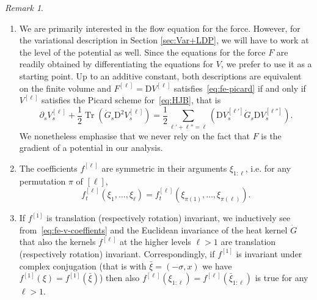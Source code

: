 \documentclass[11pt, a4paper]{scrartcl}
\numberwithin{equation}{section}
\theoremstyle{plain}
\theoremstyle{remark}
\newtheorem{remark}[foo]{Remark}
\newcommand{\mathD}{\mathrm{D}}
\newcommand{\tmdummy}{$\mbox{}$}
\newcommand{\tmop}[1]{\ensuremath{\operatorname{#1}}}
\newenvironment{enumeratealpha}{\begin{enumerate}[a{\textup{)}}] }{\end{enumerate}}
\begin{document}
\begin{remark}
  \label{rem:flow-eq}{\tmdummy}
  
  \begin{enumeratealpha}
    \item We are primarily interested in the flow equation for the force.
    However, for the variational description in Section \ref{sec:Var+LDP}, we
    will have to work at the level of the potential as well. Since the
    equations for the force $F$ are readily obtained by differentiating the
    equations for $V$, we prefer to use it as a starting point. Up to an
    additive constant, both descriptions are equivalent on the finite volume
    and $F^{[\ell]} = \mathD V^{[\ell]}$ satisfies~\eqref{eq:fe-picard} if and
    only if $V^{[\ell]}$ satisfies the Picard scheme for~\eqref{eq:HJB}, that
    is
    \begin{equation}
      \partial_s V^{[\ell]}_s + \frac{1}{2} \tmop{Tr} (\dot{G}_s \mathD^2
      V^{[\ell]}_s) = \frac{1}{2}\sum_{\ell' + \ell'' = \ell} (\mathD
      V_s^{[\ell']}  \dot{G}_s \mathD V^{[\ell'']}_s) . \label{eq:fe-V}
    \end{equation}
    We nonetheless emphasise that we never rely on the fact that $F$ is the
    gradient of a potential in our analysis.
    
    \item The coefficients $f^{[\ell]}$ are symmetric in their arguments
    $\xi_{1 : \ell}$, i.e. for any permutation $\pi$ of $[\ell]$,
    \begin{equation}
      f^{[\ell]}_t (\xi_1, \ldots, \xi_{\ell}) = f^{[\ell]}_t (\xi_{\pi (1)},
      \ldots, \xi_{\pi (\ell)}) . \label{eq:f-symm}
    \end{equation}
    \item \label{rem:translation-invariance}If $f^{[1]}$ is translation
    (respectively rotation) invariant, we inductively see
    from~\eqref{eq:fe-v-coeffients} and the Euclidean invariance of the heat
    kernel $\dot{G}$ that also the kernels $f^{[\ell]}$ at the higher levels
    $\ell > 1$ are translation (respectively rotation) invariant.
    Correspondingly, if $f^{[1]}$ is invariant under complex conjugation (that
    is with $\bar{\xi} = (- \sigma, x)$ we have $f^{[1]} (\xi) = f^{[1]}
    (\bar{\xi})$) then also $f^{[\ell]} (\xi_{1 : \ell}) = f^{[\ell]}
    (\bar{\xi}_{1 : \ell})$ is true for any $\ell > 1$.
    

\end{enumeratealpha}
\end{remark}
\end{document}

